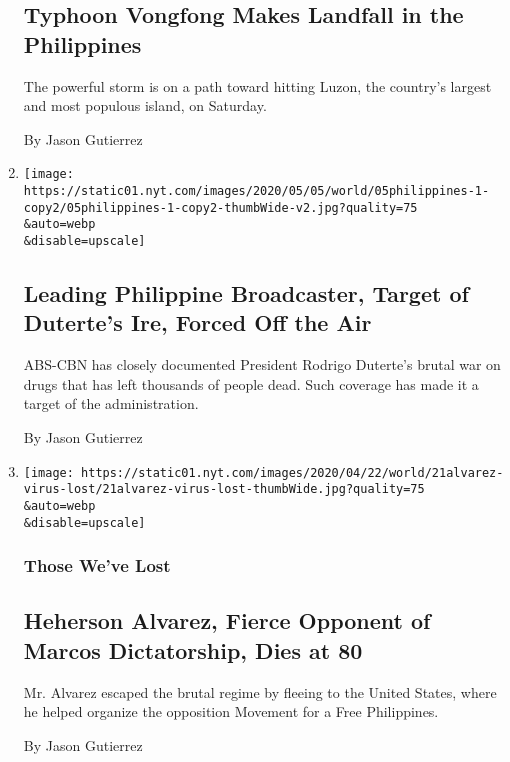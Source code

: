 \begin{enumerate}
  \hypertarget{typhoon-vongfong-makes-landfall-in-the-philippines}{%
  \subsection{Typhoon Vongfong Makes Landfall in the
  Philippines}\label{typhoon-vongfong-makes-landfall-in-the-philippines}}

  The powerful storm is on a path toward hitting Luzon, the country's
  largest and most populous island, on Saturday.

  By Jason Gutierrez
\item
  \href{/2020/05/05/world/asia/philippines-abs-cbn-duterte.html}{}

  \texttt{[image: https://static01.nyt.com/images/2020/05/05/world/05philippines-1-copy2/05philippines-1-copy2-thumbWide-v2.jpg?quality=75\\\&auto=webp\\\&disable=upscale]}

  \hypertarget{leading-philippine-broadcaster-target-of-dutertes-ire-forced-off-the-air}{%
  \subsection{Leading Philippine Broadcaster, Target of Duterte's Ire,
  Forced Off the
  Air}\label{leading-philippine-broadcaster-target-of-dutertes-ire-forced-off-the-air}}

  ABS-CBN has closely documented President Rodrigo Duterte's brutal war
  on drugs that has left thousands of people dead. Such coverage has
  made it a target of the administration.

  By Jason Gutierrez
\item
  \href{/2020/04/21/obituaries/heherson-alvarez-coronavirus-dead.html}{}

  \texttt{[image: https://static01.nyt.com/images/2020/04/22/world/21alvarez-virus-lost/21alvarez-virus-lost-thumbWide.jpg?quality=75\\\&auto=webp\\\&disable=upscale]}

  \hypertarget{those-weve-lost}{%
  \subsubsection{Those We've Lost}\label{those-weve-lost}}

  \hypertarget{heherson-alvarez-fierce-opponent-of-marcos-dictatorship-dies-at-80}{%
  \subsection{Heherson Alvarez, Fierce Opponent of Marcos Dictatorship,
  Dies at
  80}\label{heherson-alvarez-fierce-opponent-of-marcos-dictatorship-dies-at-80}}

  Mr. Alvarez escaped the brutal regime by fleeing to the United States,
  where he helped organize the opposition Movement for a Free
  Philippines.

  By Jason Gutierrez
\end{enumerate}

